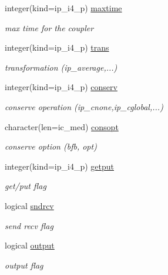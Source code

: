 \begin{DoxyCompactItemize}
integer(kind=ip\+\_\+i4\+\_\+p) \hyperlink{structmod__oasis__coupler_1_1prism__coupler__type_abe7dd91c4d011f5717e203191b7788e3}{maxtime}
\begin{DoxyCompactList}\small\item\em max time for the coupler \end{DoxyCompactList}\item 
integer(kind=ip\+\_\+i4\+\_\+p) \hyperlink{structmod__oasis__coupler_1_1prism__coupler__type_ad9fad1fec923d4db974f94fd0bca5697}{trans}
\begin{DoxyCompactList}\small\item\em transformation (ip\+\_\+average,...) \end{DoxyCompactList}\item 
integer(kind=ip\+\_\+i4\+\_\+p) \hyperlink{structmod__oasis__coupler_1_1prism__coupler__type_a6ae875acb2785153668c3e773ed9682f}{conserv}
\begin{DoxyCompactList}\small\item\em conserve operation (ip\+\_\+cnone,ip\+\_\+cglobal,...) \end{DoxyCompactList}\item 
character(len=ic\+\_\+med) \hyperlink{structmod__oasis__coupler_1_1prism__coupler__type_ab539821ab680aa56c81cb541c093f50f}{consopt}
\begin{DoxyCompactList}\small\item\em conserve option (bfb, opt) \end{DoxyCompactList}\item 
integer(kind=ip\+\_\+i4\+\_\+p) \hyperlink{structmod__oasis__coupler_1_1prism__coupler__type_a72f8ada57213a9c0e6ab85742c521f86}{getput}
\begin{DoxyCompactList}\small\item\em get/put flag \end{DoxyCompactList}\item 
logical \hyperlink{structmod__oasis__coupler_1_1prism__coupler__type_a45db2da67a23b8a4b693d0b7882996b5}{sndrcv}
\begin{DoxyCompactList}\small\item\em send recv flag \end{DoxyCompactList}\item 
logical \hyperlink{structmod__oasis__coupler_1_1prism__coupler__type_a56fc19e4619dd8224859f222566ea7ca}{output}
\begin{DoxyCompactList}\small\item\em output flag \end{DoxyCompactList}\item 

\end{DoxyCompactItemize}
